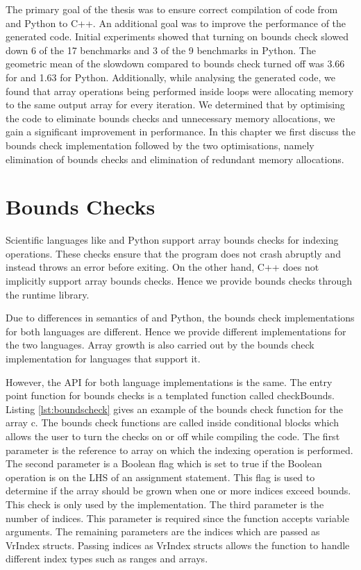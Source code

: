 The primary goal of the thesis was to ensure correct compilation of code from \matlab and Python to C++. An additional goal was to improve the performance of the generated code. Initial experiments showed that turning on bounds check slowed down 6 of the 17 benchmarks and 3 of the 9 benchmarks in Python. The geometric mean of the slowdown compared to bounds check turned off was 3.66 for \matlab and 1.63 for Python. Additionally, while analysing the generated code, we found that array operations being performed inside loops were allocating memory to the same output array for every iteration. We determined that by optimising the code to eliminate bounds checks and unnecessary memory allocations, we gain a significant improvement in performance. In this chapter we first discuss the bounds check implementation followed by the two optimisations, namely elimination of bounds checks and elimination of redundant memory allocations. 

\section{Bounds Checks}
Scientific languages like \matlab and Python support array bounds checks for indexing operations. These checks ensure that the program does not crash abruptly and instead throws an error before exiting. On the other hand, C++ does not implicitly support array bounds checks. Hence we provide bounds checks through the runtime library.

Due to differences in semantics of \matlab and Python, the bounds check implementations for both languages are different. Hence we provide different implementations for the two languages. Array growth is also carried out by the bounds check implementation for languages that support it. 

However, the API for both language implementations is the same. The entry point function for bounds checks is a templated function called \textsf{checkBounds}. Listing \ref{lst:boundscheck} gives an example of the bounds check function for the array \textsf{c}. The bounds check functions are called inside conditional blocks which allows the user to turn the checks on or off while compiling the code. The first parameter is the reference to array on which the indexing operation is performed. The second parameter is a Boolean flag which is set to true if the Boolean operation is on the LHS of an assignment statement. This flag is used to determine if the array should be grown when one or more indices exceed bounds. This check is only used by the \matlab implementation. The third parameter is the number of indices. This parameter is required since the function accepts variable arguments. The remaining parameters are the indices which are passed as VrIndex structs. Passing indices as VrIndex structs allows the function to handle different index types such as ranges and arrays.

